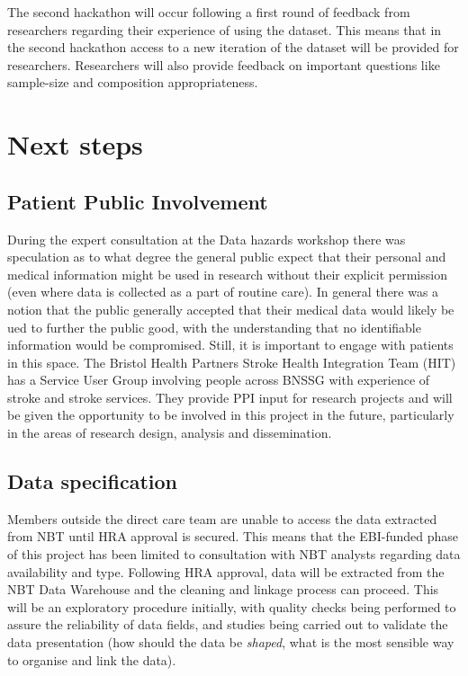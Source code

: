 \documentclass{article}
\begin{document}
The second hackathon will occur following a first round of feedback
from researchers regarding their experience of using the dataset. This
means that in the second hackathon access to a new iteration of the
dataset will be provided for researchers. Researchers will also
provide feedback on important questions like sample-size and
composition appropriateness. 

\section{Next steps}


\subsection{Patient Public Involvement}


During the expert consultation at the Data hazards workshop there was speculation as to what degree the general public expect that
their personal and medical information might be used in research
without their explicit permission (even where data is collected as a
part of routine care).
In general there was a notion that the public generally accepted that
their medical data would likely be ued to further the public good,
with the understanding that no identifiable information would be
compromised. Still, it is important to engage with patients in this
space. The Bristol Health Partners Stroke Health Integration Team
(HIT) has a Service User Group involving people across BNSSG with
experience of stroke and stroke services.
They provide PPI input for research projects and will be given the
opportunity to be involved in this project in the future,
particularly in the areas of research design, analysis and
dissemination.

\subsection{Data specification}

Members outside the direct care team are unable to access the data
extracted from NBT until HRA approval is secured. This means that the
EBI-funded phase of this project has been limited to consultation with
NBT analysts regarding data availability and type. Following HRA
approval, data will be extracted from the NBT Data Warehouse and the
cleaning and linkage process can proceed. This will be an exploratory
procedure initially, with quality checks being performed to assure the
reliability of data fields, and studies being carried out to validate
the data presentation (how should the data be \textit{shaped}, what is
the most sensible way to organise and link the data).\\
\end{document}
